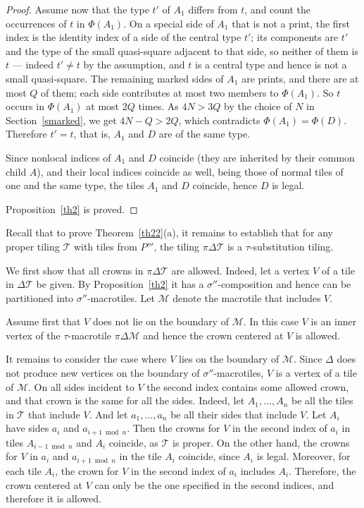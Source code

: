 \documentclass[12pt]{article}
\theoremstyle{remark}
\begin{document}
\begin{proof}
Assume now that the type $t'$ of $A_1$ differs from $t$, and count the occurrences of $t$ in
$\Phi(A_1)$. On a special side of $A_1$ that is not a print, the first index is the identity index
of a side of the central type $t'$; its components are $t'$ and the type of the small quasi-square
adjacent to that side, so neither of them is $t$ --- indeed $t'\ne t$ by the assumption, and $t$ is
a central type and hence is not a small quasi-square. The remaining marked sides of $A_1$ are
prints, and there are at most $Q$ of them; each side contributes at most two members to
$\Phi(A_1)$. So $t$ occurs in $\Phi(A_1)$ at most $2Q$ times. As $4N>3Q$ by the choice of $N$ in
Section~\ref{smarked}, we get $4N-Q>2Q$, which contradicts $\Phi(A_1)=\Phi(D)$. Therefore $t'=t$,
that is, $A_1$ and $D$ are of the same type.

Since  nonlocal indices of $A_1$ and $D$ coincide (they are inherited by their common child  $A$),
and their local indices coincide as well, being those of normal tiles of one and the same type,
the tiles $A_1$ and $D$ coincide, hence $D$ is legal.

Proposition~\ref{th2} is proved.
\end{proof}

Recall that to prove Theorem~\ref{th22}(a),
it remains to establish that for any proper tiling
$\mathcal T$ with tiles from $P'''$, the tiling
$\pi\Delta\mathcal T$ is a $\tau$-substitution tiling.

 We first show that all  crowns in $\pi\Delta\mathcal T$ are allowed.
Indeed,  let a vertex $V$ of a tile in  $\Delta\mathcal T$ 
 be given. By Proposition~\ref{th2} it has a $\sigma''$-composition
and hence can be  partitioned into $\sigma''$-macrotiles. 
Let $\mathcal M$ denote the macrotile that includes $V$.

Assume first that $V$ does not lie 
on the boundary of $\mathcal M$. 
In this case $V$ is an inner vertex of the $\tau$-macrotile $\pi\Delta\mathcal M$ 
and hence the crown centered at $V$ is allowed.


It remains to consider the case where $V$ lies 
on the boundary of $\mathcal M$. Since $\Delta$ does not produce new vertices on the boundary 
of $\sigma''$-macrotiles, $V$ is a vertex of a tile of $\mathcal M$.
On all sides incident to $V$ the second index contains some allowed crown, 
and that crown is the same for all the sides.
Indeed, let $A_1,\dots, A_n$ be all the tiles in $\mathcal T$ that include  $V$. And let 
$a_1,\dots, a_n$ be all their  sides that include $V$. 
Let $A_i$ have sides  $a_i$ and $a_{i+1 \bmod n}$.
 Then the crowns for $V$ in the second index of  
 $a_i$ in tiles $A_{i-1\bmod n}$ and  $A_i$ coincide, as $\mathcal T$ is proper.
On the other hand, the crowns for $V$ in $a_i$ and $a_{i+1 \bmod n}$ in the tile $A_i$ coincide, since 
$A_i$ is legal. 
 Moreover, for each tile $A_i$, the crown for $V$ in the second index of $a_i$ includes $A_i$.
 Therefore, the crown centered at $V$ can only be the one specified in the
 second indices, and therefore it is allowed.
\end{document}
